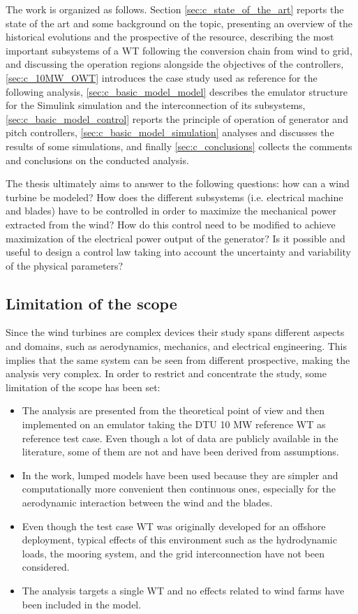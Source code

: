 The work is organized as follows. Section \ref{sec:c_state_of_the_art} reports the state of the art and some background on the topic, presenting an overview of the historical evolutions and the prospective of the resource, describing the most important subsystems of a WT following the conversion chain from wind to grid, and discussing the operation regions alongside the objectives of the controllers, \autoref{sec:c_10MW_OWT} introduces the case study used as reference for the following analysis, \autoref{sec:c_basic_model_model} describes the emulator structure for the Simulink simulation and the interconnection of its subsystems, \autoref{sec:c_basic_model_control} reports the principle of operation of generator and pitch controllers, \autoref{sec:c_basic_model_simulation} analyses and discusses the results of some simulations, and finally \autoref{sec:c_conclusions} collects the comments and conclusions on the conducted analysis.

The thesis ultimately aims to answer to the following questions: how can a wind turbine be modeled? How does the different subsystems (i.e. electrical machine and blades) have to be controlled in order to maximize the mechanical power extracted from the wind? How do this control need to be modified to achieve maximization of the electrical power output of the generator? Is it possible and useful to design a control law taking into account the uncertainty and variability of the physical parameters?

\subsection{Limitation of the scope}\label{subsec:limitation_of_scope}
Since the wind turbines are complex devices their study spans different aspects and domains, such as aerodynamics, mechanics, and electrical engineering. This implies that the same system can be seen from different prospective, making the analysis very complex. In order to restrict and concentrate the study, some limitation of the scope has been set:
\begin{itemize}
  \item The analysis are presented from the theoretical point of view and then implemented on an emulator taking the DTU 10 MW reference \acrshort{WT} as reference test case. Even though a lot of data are publicly available in the literature, some of them are not and have been derived from assumptions.
  \item In the work, lumped models have been used because they are simpler and computationally more convenient then continuous ones, especially for the aerodynamic interaction between the wind and the blades.
  \item Even though the test case WT was originally developed for an offshore deployment, typical effects of this environment such as the hydrodynamic loads, the mooring system, and the grid interconnection have not been considered. 
  \item The analysis targets a single WT and no effects related to wind farms have been included in the model. 
\end{itemize}